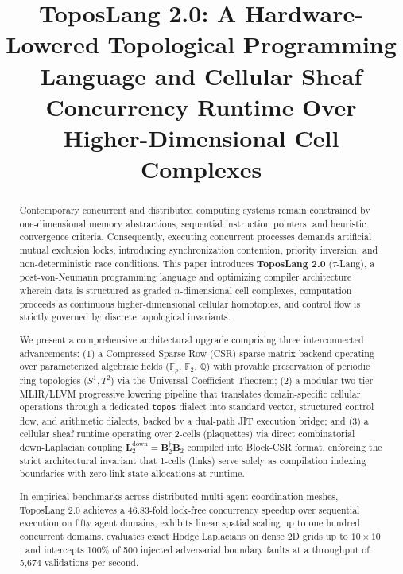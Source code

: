 \documentclass[conference]{IEEEtran}
\begin{document}
\title{ToposLang 2.0: A Hardware-Lowered Topological Programming Language and Cellular Sheaf Concurrency Runtime Over Higher-Dimensional Cell Complexes}

\author{
}

\maketitle

\begin{abstract}
Contemporary concurrent and distributed computing systems remain constrained by one-dimensional memory abstractions, sequential instruction pointers, and heuristic convergence criteria. Consequently, executing concurrent processes demands artificial mutual exclusion locks, introducing synchronization contention, priority inversion, and non-deterministic race conditions. This paper introduces \textbf{ToposLang 2.0} ($\tau$-Lang), a post-von-Neumann programming language and optimizing compiler architecture wherein data is structured as graded $n$-dimensional cell complexes, computation proceeds as continuous higher-dimensional cellular homotopies, and control flow is strictly governed by discrete topological invariants. 

We present a comprehensive architectural upgrade comprising three interconnected advancements: (1) a Compressed Sparse Row (CSR) sparse matrix backend operating over parameterized algebraic fields ($\mathbb{F}_p$, $\mathbb{F}_2$, $\mathbb{Q}$) with provable preservation of periodic ring topologies ($S^1, T^2$) via the Universal Coefficient Theorem; (2) a modular two-tier MLIR/LLVM progressive lowering pipeline that translates domain-specific cellular operations through a dedicated \texttt{topos} dialect into standard vector, structured control flow, and arithmetic dialects, backed by a dual-path JIT execution bridge; and (3) a cellular sheaf runtime operating over 2-cells (plaquettes) via direct combinatorial down-Laplacian coupling $\mathbf{L}_2^{\text{down}} = \mathbf{B}_2^\dagger \mathbf{B}_2$ compiled into Block-CSR format, enforcing the strict architectural invariant that 1-cells (links) serve solely as compilation indexing boundaries with zero link state allocations at runtime. 

In empirical benchmarks across distributed multi-agent coordination meshes, ToposLang 2.0 achieves a 46.83-fold lock-free concurrency speedup over sequential execution on fifty agent domains, exhibits linear spatial scaling up to one hundred concurrent domains, evaluates exact Hodge Laplacians on dense 2D grids up to $10 \times 10$, and intercepts 100\% of 500 injected adversarial boundary faults at a throughput of 5,674 validations per second.
\end{abstract}
\end{document}
